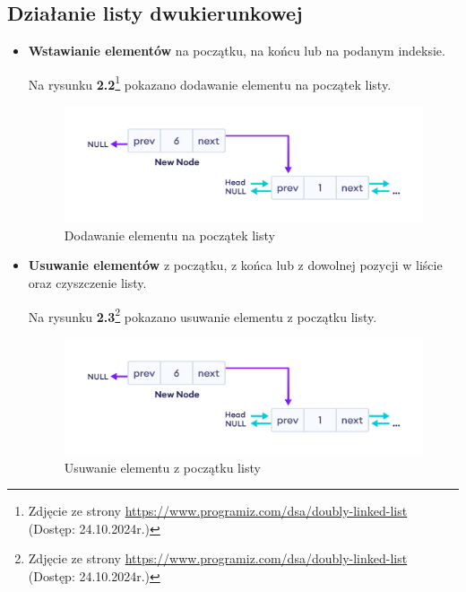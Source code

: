 \newpage
\subsection{Działanie listy dwukierunkowej}
\begin{itemize}
  \item \textbf{Wstawianie elementów} na początku, na końcu lub na podanym indeksie.

        Na rysunku \textbf{2.2}\footnote{Zdjęcie ze strony \url{https://www.programiz.com/dsa/doubly-linked-list}\cite{Programiz} \\ (Dostęp: 24.10.2024r.)} pokazano dodawanie elementu na początek listy.

        \begin{figure}[!htb]
          \begin{center}
            \includegraphics[width=\textwidth]{rys/dodawanie-elementu.png}
            \caption{Dodawanie elementu na początek listy}\label{rys:dodawanie_elementu}
          \end{center}
        \end{figure}

  \item \textbf{Usuwanie elementów} z początku, z końca lub z dowolnej pozycji w liście oraz czyszczenie listy.

        Na rysunku \textbf{2.3}\footnote{Zdjęcie ze strony \url{https://www.programiz.com/dsa/doubly-linked-list}\cite{Programiz} \\ (Dostęp: 24.10.2024r.)} pokazano usuwanie elementu z początku listy.

        \begin{figure}[!htb]
          \begin{center}
            \includegraphics[width=\textwidth]{rys/dodawanie-elementu.png}
            \caption{Usuwanie elementu z początku listy}\label{rys:usuwanie_elementu}
          \end{center}
        \end{figure}


\end{itemize}
